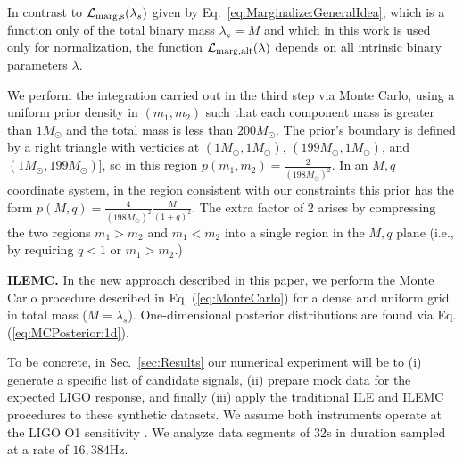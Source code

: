 \documentclass[aps,prd,nofootinbib,showpacs,amssymb,twocolumn]{revtex4}
\begin{document}
In contrast to ${\cal L}_{\rm marg, s}(\lambda_s)$ 
%
given by Eq.~\eqref{eq:Marginalize:GeneralIdea}, which is a function only of the total binary mass
$\lambda_s=M$ and which in this work is used only for normalization, the function ${\cal L}_{\rm marg,alt}(\lambda)$
depends on all intrinsic binary parameters $\lambda$.

 We perform the 
%
integration carried out in the third step via Monte Carlo, using a uniform prior density in
$(m_1,m_2)$ 
%
such that each component mass is greater than $1 M_\odot$ and the total mass is less than $200
 M_\odot$.   
%
The prior's boundary is defined by a right triangle with verticies at $(1M_\odot,1M_\odot)$, $(199 M_\odot,1M_\odot)$, and $(1M_\odot,199 M_\odot)$], so in this region $p(m_1,m_2) = \frac{2}{(198 M_\odot)^2}$.  In 
%
an $M,q$ coordinate system, in the region consistent with our constraints this prior has the
form $p(M,q) = \frac{4}{(198 M_\odot)^2} \frac{M}{(1+q)^2} $.
%
%
The extra factor of 2 arises by compressing the two regions $m_1>m_2$ and $m_1<m_2$ into a single region in the $M,q$ plane (i.e., by requiring $q<1$ or $m_1>m_2$.)
%
%
%

\noindent \textbf{ILEMC.} In the new approach described in this paper, we perform the Monte Carlo procedure described in Eq. (\ref{eq:MonteCarlo})
for a dense and uniform grid in total mass ($M=\lambda_s$).
%
%
One-dimensional posterior distributions are found via Eq.(\ref{eq:MCPosterior:1d}).  

%

To be concrete, in Sec.~\ref{sec:Results} our numerical experiment 
%
will be to
(i) generate a specific list of candidate signals, 
(ii) prepare mock data for the expected LIGO response,
 and finally (iii) apply 
%
the traditional ILE and ILEMC procedures to 
%
these synthetic datasets.  We assume both instruments operate at the LIGO O1 sensitivity
\cite{DetectorPaper}. We analyze data segments of 32s in duration sampled at a rate of $16,384$Hz. 
%
\end{document}
